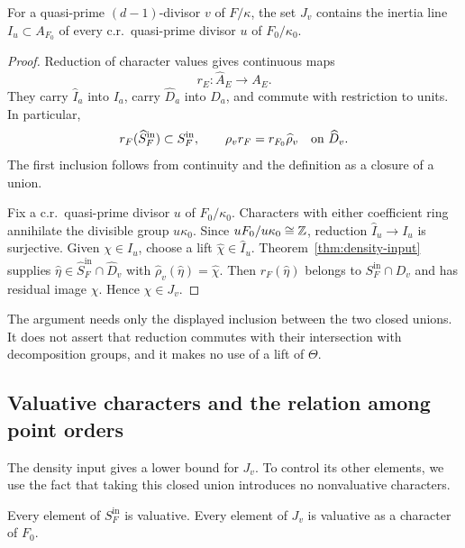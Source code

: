 \begin{lemma}\label{lem:residual-density-mod-ell}
For a quasi-prime \((d-1)\)-divisor \(v\) of \(F/\kappa\), the set \(J_v\)
contains the inertia line \(I_u\subset A_{F_0}\) of every c.r.\
quasi-prime divisor \(u\) of \(F_0/\kappa_0\).
\end{lemma}

\begin{proof}
Reduction of character values gives continuous maps
\[
 r_E:\widehat A_E\longrightarrow A_E.
\]
They carry \(\widehat I_a\) into \(I_a\), carry \(\widehat D_a\) into
\(D_a\), and commute with restriction to units. In particular,
\[
 r_F(\widehat S_F^{\mathrm{in}})\subset S_F^{\mathrm{in}},
 \qquad
 \rho_v r_F=r_{F_0}\widehat\rho_v
       \quad\hbox{on }\widehat D_v.
\]
The first inclusion follows from continuity and the definition as a
closure of a union.

Fix a c.r.\ quasi-prime divisor \(u\) of \(F_0/\kappa_0\). Characters with
either coefficient ring annihilate the divisible group \(u\kappa_0\).
Since \(uF_0/u\kappa_0\cong\mathbb Z\), reduction
\(\widehat I_u\to I_u\) is surjective. Given \(\chi\in I_u\), choose a
lift \(\widehat\chi\in\widehat I_u\).
Theorem~\ref{thm:density-input} supplies
\(\widehat\eta\in\widehat S_F^{\mathrm{in}}\cap\widehat D_v\) with
\(\widehat\rho_v(\widehat\eta)=\widehat\chi\).
Then \(r_F(\widehat\eta)\) belongs to \(S_F^{\mathrm{in}}\cap D_v\) and
has residual image \(\chi\). Hence \(\chi\in J_v\).
\end{proof}

The argument needs only the displayed inclusion between the two closed
unions. It does not assert that reduction commutes with their
intersection with decomposition groups, and it makes no use of a lift
of \(\Theta\).

\subsection{Valuative characters and the relation among point orders}

The density input gives a lower bound for \(J_v\). To control its other
elements, we use the fact that taking this closed union introduces no
nonvaluative characters.

\begin{lemma}\label{lem:residual-valuative}
Every element of \(S_F^{\mathrm{in}}\) is valuative. Every element of
\(J_v\) is valuative as a character of \(F_0\).
\end{lemma}

